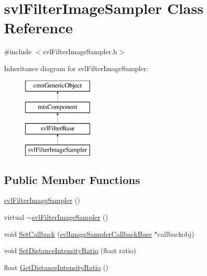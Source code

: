 \hypertarget{classsvl_filter_image_sampler}{\section{svl\-Filter\-Image\-Sampler Class Reference}
\label{classsvl_filter_image_sampler}
}


{\ttfamily \#include $<$svl\-Filter\-Image\-Sampler.\-h$>$}

Inheritance diagram for svl\-Filter\-Image\-Sampler\-:\begin{figure}[H]
\begin{center}
\leavevmode
\includegraphics[height=4.000000cm]{d0/db0/classsvl_filter_image_sampler}
\end{center}
\end{figure}
\subsection*{Public Member Functions}
\begin{DoxyCompactItemize}
\item 
\hyperlink{classsvl_filter_image_sampler_a4528022d91fa83c09b309b0a68eb6419}{svl\-Filter\-Image\-Sampler} ()
\item 
virtual \hyperlink{classsvl_filter_image_sampler_aa8950af662941ab7c17b909ed78a51fa}{$\sim$svl\-Filter\-Image\-Sampler} ()
\item 
void \hyperlink{classsvl_filter_image_sampler_a9f2a0959d994311d9238ebf13bedd923}{Set\-Callback} (\hyperlink{classsvl_image_sampler_callback_base}{svl\-Image\-Sampler\-Callback\-Base} $\ast$callbackobj)
\item 
void \hyperlink{classsvl_filter_image_sampler_a9b3d4f5197e111d9d4c4b6e6f497212c}{Set\-Distance\-Intensity\-Ratio} (float ratio)
\item 
float \hyperlink{classsvl_filter_image_sampler_a1200847f560dac60f26c72d3fac9ac50}{Get\-Distance\-Intensity\-Ratio} ()
\end{DoxyCompactItemize}
